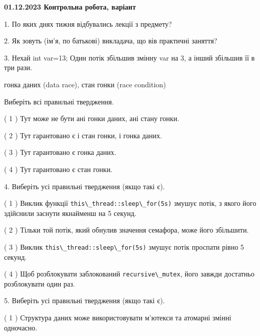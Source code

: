 \documentclass[12pt, ukrainian]{article}
\def\code#1{\Verb!#1!}
\begin{document}
\vspace{4mm}
\newpage
\begin {large}

\textbf{01.12.2023 Контрольна робота, варіант  }\par


{
1. По яких днях тижня відбувались лекції з предмету?



\vspace{5mm}
2. Як зовуть (ім'я, по батькові) викладача, що вів практичні заняття?



\vspace{5mm}
3. Нехай int var=13; Один потік збільшив змінну var на 3, а інший збільшив її в три рази.

гонка даних (data race), стан гонки (race condition)

Виберіть всі правильні твердження.\par
\vspace{2mm}
( 1 ) Тут може не бути ані гонки даних, ані стану гонки.%

( 2 ) Тут гарантовано є і стан гонки, і гонка даних.%

( 3 ) Тут гарантовано є гонка даних.%

( 4 ) Тут гарантовано є стан гонки.%


\vspace{5mm}
4. Виберіть усі правильні твердження (якщо такі є).\par
\vspace{2mm}

( 1 ) Виклик функції \code{this\_thread::sleep\_for(5s)} змушує потік, з якого його здійснили заснути якнайменш на 5 секунд.%

( 2 ) Тільки той потік, який обнулив значення семафора, може його збільшити.%

( 3 ) Виклик \code{this\_thread::sleep\_for(5s)} змушує потік проспати рівно 5 секунд.%

( 4 ) Щоб розблокувати заблокований \code{recursive\_mutex}, його завжди достатньо розблокувати один раз.%


\vspace{5mm}
5. Виберіть усі правильні твердження (якщо такі є).\par
\vspace{2mm}

( 1 ) Структура даних може використовувати м’ютекси та атомарні змінні одночасно.%

}
\end{large}
\end{document}

